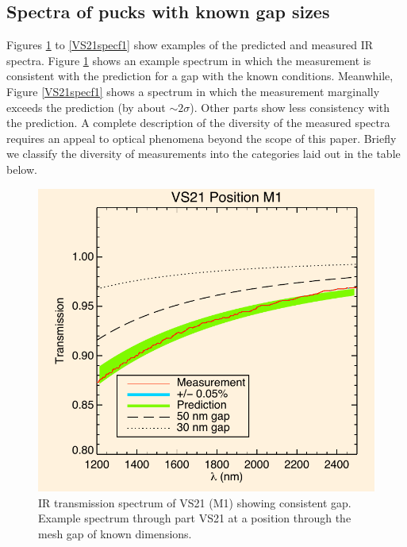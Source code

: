 \documentclass[osajnl,preprint,showpacs,superscriptaddress,12pt]{revtex4-1} %
\begin{document}
\subsection{Spectra of pucks with known gap sizes}
Figures \ref{VS21specm1} to \ref{VS21specf1} show examples of the predicted and measured IR spectra.  Figure \ref{VS21specm1} shows an example spectrum in which the measurement is consistent with the prediction for a gap with the known conditions.  Meanwhile, Figure \ref{VS21specf1} shows a spectrum in which the measurement marginally exceeds the prediction (by about $\sim 2 \sigma$).  Other parts show less consistency with the prediction.  A complete description of the diversity of the measured spectra requires an appeal to optical phenomena beyond the scope of this paper.  Briefly we classify the diversity of measurements into the categories laid out in the table below.  

\begin{figure}[htbp]
\centerline{\includegraphics[width=.8\columnwidth]{figs/20130911_VS21posM1}}
\caption{IR transmission spectrum of VS21 (M1) showing consistent gap\label{VS21specm1}.  Example spectrum through part VS21 at a position through the mesh gap of known dimensions.}
\end{figure}
\end{document}
